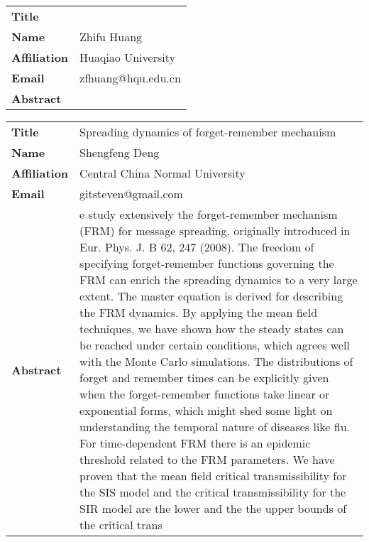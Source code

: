 \documentclass[oneside,A4paper,12pt]{article}
\begin{document}
\newpage
\begin{longtable}{p{2cm}p{14cm}}
\toprule
\textbf{Title} & \\
\textbf{Name} & Zhifu Huang\\
\textbf{Affiliation} & Huaqiao University\\
\textbf{Email} & zfhuang@hqu.edu.cn\\
\textbf{Abstract} & \\
\bottomrule
\end{longtable}


\newpage
\begin{longtable}{p{2cm}p{14cm}}
\toprule
\textbf{Title} & Spreading dynamics of forget-remember mechanism\\
\textbf{Name} & Shengfeng Deng\\
\textbf{Affiliation} & Central China Normal University\\
\textbf{Email} & gitsteven@gmail.com\\
\textbf{Abstract} & e study extensively the forget-remember mechanism (FRM) for message spreading, originally introduced in Eur. Phys. J. B 62, 247 (2008). The freedom of specifying forget-remember functions governing the FRM can enrich the spreading dynamics to a very large extent. The master equation is derived for describing the FRM dynamics. By applying the mean field techniques, we have shown how the steady states can be reached under certain conditions, which agrees well with the Monte Carlo simulations. The distributions of forget and remember times can be explicitly given when the forget-remember functions take linear or exponential forms, which might shed some light on understanding the temporal nature of diseases like flu. For time-dependent FRM there is an epidemic threshold related to the FRM parameters. We have proven that the mean field critical transmissibility for the SIS model and the critical transmissibility for the SIR model are the lower and the the upper bounds of the critical trans\\
\bottomrule
\end{longtable}

\newpage
\end{document}
